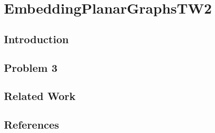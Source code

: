 \documentclass[../main.tex]{subfiles}
\begin{document}
	
	\section{EmbeddingPlanarGraphsTW2}
	\subsection{Introduction}
	\subsection{Problem 3}
	\subsection{Related Work}
	\subsection{References}
	
	
	
\end{document}
